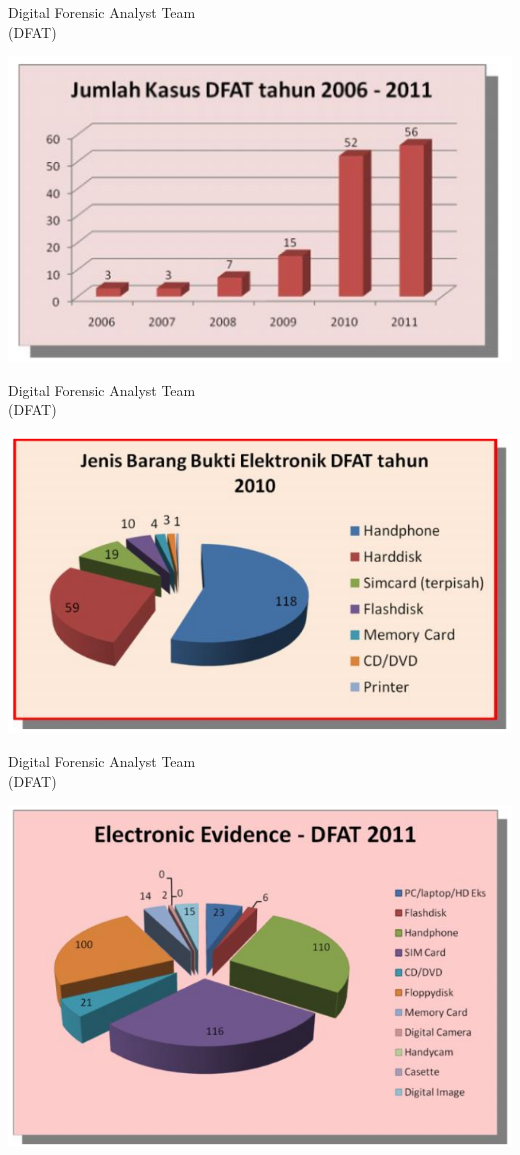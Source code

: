 \documentclass[pdflatex,compress]{beamer}
\begin{document}
\begin{frame}{Digital Forensic Analyst Team\\(DFAT)}
	\begin{center}
		\includegraphics[width=0.7\linewidth]{img/img01}
	\end{center}
\end{frame}

\begin{frame}{Digital Forensic Analyst Team\\(DFAT)}
	\begin{center}
		\includegraphics[width=0.7\linewidth]{img/img02}
	\end{center}
\end{frame}

\begin{frame}{Digital Forensic Analyst Team\\(DFAT)}
	\begin{center}
		\includegraphics[width=0.7\linewidth]{img/img03}
	\end{center}
\end{frame}
\end{document}
